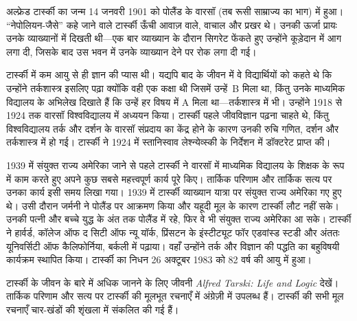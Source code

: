 \documentclass[../../../include/open-logic-section]{subfiles}
\begin{document}



अल्फ्रेड टार्स्की का जन्म 14 जनवरी 1901 को पोलैंड के वारसॉ (तब रूसी
साम्राज्य का भाग) में हुआ। ``नेपोलियन-जैसे'' कहे जाने वाले टार्स्की ऊँची
आवाज़ वाले, वाचाल और प्रखर थे। उनकी ऊर्जा प्रायः उनके व्याख्यानों में दिखती
थी---एक बार व्याख्यान के दौरान सिगरेट फेंकते हुए उन्होंने कूड़ेदान में आग
लगा दी, जिसके बाद उस भवन में उनके व्याख्यान देने पर रोक लगा दी गई।

टार्स्की में कम आयु से ही ज्ञान की प्यास थी। यद्यपि बाद के जीवन में वे
विद्यार्थियों को कहते थे कि उन्होंने तर्कशास्त्र इसलिए पढ़ा क्योंकि वही एक
कक्षा थी जिसमें उन्हें~B मिला था, किंतु उनके माध्यमिक विद्यालय के अभिलेख
दिखाते हैं कि उन्हें हर विषय में A मिला था---तर्कशास्त्र में भी। उन्होंने
1918 से 1924 तक वारसॉ विश्वविद्यालय में अध्ययन किया। टार्स्की पहले जीवविज्ञान
पढ़ना चाहते थे, किंतु विश्वविद्यालय तर्क और दर्शन के वारसॉ संप्रदाय का
केंद्र होने के कारण उनकी रुचि गणित, दर्शन और तर्कशास्त्र में हो गई। टार्स्की
ने 1924 में स्तानिस्वाव लेश्न्येव्स्की के निर्देशन में डॉक्टरेट प्राप्त की।

1939 में संयुक्त राज्य अमेरिका जाने से पहले टार्स्की ने वारसॉ में माध्यमिक
विद्यालय के शिक्षक के रूप में काम करते हुए अपने कुछ सबसे महत्त्वपूर्ण कार्य
पूरे किए। तार्किक परिणाम और तार्किक सत्य पर उनका कार्य इसी समय लिखा गया।
1939 में टार्स्की व्याख्यान यात्रा पर संयुक्त राज्य अमेरिका गए हुए थे। उसी
दौरान जर्मनी ने पोलैंड पर आक्रमण किया और यहूदी मूल के कारण टार्स्की लौट नहीं
सके। उनकी पत्नी और बच्चे युद्ध के अंत तक पोलैंड में रहे, फिर वे भी संयुक्त
राज्य अमेरिका आ सके। टार्स्की ने हार्वर्ड, कॉलेज ऑफ द सिटी ऑफ न्यू यॉर्क,
प्रिंसटन के इंस्टीट्यूट फॉर एडवांस्ड स्टडी और अंततः यूनिवर्सिटी ऑफ
कैलिफोर्निया, बर्कली में पढ़ाया। वहाँ उन्होंने तर्क और विज्ञान की पद्धति का
बहुविषयी कार्यक्रम स्थापित किया। टार्स्की का निधन 26 अक्टूबर 1983 को 82 वर्ष
की आयु में हुआ।

\begin{reading} 
टार्स्की के जीवन के बारे में अधिक जानने के लिए जीवनी \emph{Alfred Tarski:
Life and Logic} \citep{Feferman2004} देखें। तार्किक परिणाम और सत्य पर
टार्स्की की मूलभूत रचनाएँ \citep{Tarski1983} में अंग्रेज़ी में उपलब्ध हैं।
टार्स्की की सभी मूल रचनाएँ चार-खंडों की शृंखला \citep{Tarski1981} में
संकलित की गई हैं।
\end{reading}
\end{document}
